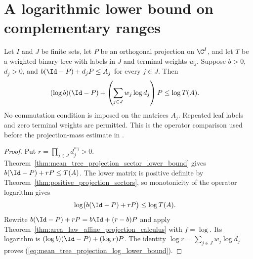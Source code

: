 \section{A logarithmic lower bound on complementary ranges}
\label{sec:mean_tree_projection_log_bound}

\begin{theorem}
\label{thm:mean_tree_projection_log_lower_bound}
\leanok
{}
Let $I$ and $J$ be finite sets, let $P$ be an orthogonal projection on
$\C^I$, and let $T$ be a weighted binary tree with labels in $J$ and
terminal weights $w_j$. Suppose $b>0$, $d_j>0$, and
$b(\Id-P)+d_jP\le A_j$ for every $j\in J$. Then
\begin{align}
 (\log b)(\Id-P)+\left(\sum_{j\in J}w_j\log d_j\right)P
 &\le\log T(A).
 \label{eq:mean_tree_projection_log_lower_bound}
\end{align}
No commutation condition is imposed on the matrices $A_j$.
Repeated leaf labels and zero terminal weights are permitted.
This is the operator comparison used before the projection-mass estimate
in \cite[lines~603--640 of the norm-comparison argument]{OpenAI2026AreaLaw}.
\end{theorem}
\begin{proof}
\leanok
{}
Put $r=\prod_{j\in J}d_j^{w_j}>0$.
Theorem~\ref{thm:mean_tree_projection_sector_lower_bound} gives
$b(\Id-P)+rP\le T(A)$. The lower matrix is positive definite by
Theorem~\ref{thm:positive_projection_sectors}, so monotonicity of the
operator logarithm gives
\begin{align}
 \log\bigl(b(\Id-P)+rP\bigr)&\le\log T(A).\notag
\end{align}
Rewrite $b(\Id-P)+rP=b\Id+(r-b)P$ and apply
Theorem~\ref{thm:area_law_affine_projection_calculus} with $f=\log$.
Its logarithm is $(\log b)(\Id-P)+(\log r)P$.
The identity $\log r=\sum_{j\in J}w_j\log d_j$ proves
(\ref{eq:mean_tree_projection_log_lower_bound}).
\end{proof}
